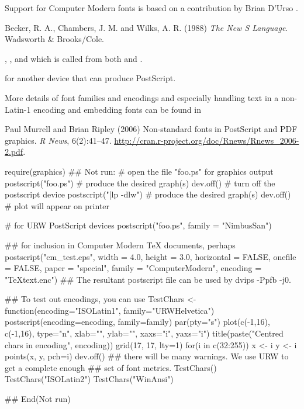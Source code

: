 %
\begin{Author}\relax
Support for Computer Modern fonts is based on a contribution by
Brian D'Urso .
\end{Author}
%
\begin{References}\relax
Becker, R. A., Chambers, J. M. and Wilks, A. R. (1988)
\emph{The New S Language}.
Wadsworth \& Brooks/Cole.
\end{References}
%
\begin{SeeAlso}\relax
{},
,
and  which is called from both
 and .

 for another device that can produce PostScript.

More details of font families and encodings and especially handling
text in a non-Latin-1 encoding and embedding fonts can be found in

Paul Murrell and Brian Ripley (2006) Non-standard fonts in PostScript
and PDF graphics. \emph{R News}, 6(2):41--47.
\url{http://cran.r-project.org/doc/Rnews/Rnews_2006-2.pdf}.
\end{SeeAlso}
%
\begin{Examples}
\begin{ExampleCode}
require(graphics)
## Not run: 
# open the file "foo.ps" for graphics output
postscript("foo.ps")
# produce the desired graph(s)
dev.off()              # turn off the postscript device
postscript("|lp -dlw")
# produce the desired graph(s)
dev.off()              # plot will appear on printer

# for URW PostScript devices
postscript("foo.ps", family = "NimbusSan")

## for inclusion in Computer Modern TeX documents, perhaps
postscript("cm_test.eps", width = 4.0, height = 3.0,
           horizontal = FALSE, onefile = FALSE, paper = "special",
           family = "ComputerModern", encoding = "TeXtext.enc")
## The resultant postscript file can be used by dvips -Ppfb -j0.

## To test out encodings, you can use
TestChars <- function(encoding="ISOLatin1", family="URWHelvetica")
{
    postscript(encoding=encoding, family=family)
    par(pty="s")
    plot(c(-1,16), c(-1,16), type="n", xlab="", ylab="",
         xaxs="i", yaxs="i")
    title(paste("Centred chars in encoding", encoding))
    grid(17, 17, lty=1)
    for(i in c(32:255)) {
        x <- i %
        y <- i %
        points(x, y, pch=i)
    }
    dev.off()
}
## there will be many warnings.  We use URW to get a complete enough
## set of font metrics.
TestChars()
TestChars("ISOLatin2")
TestChars("WinAnsi")

## End(Not run)

\end{ExampleCode}
\end{Examples}
